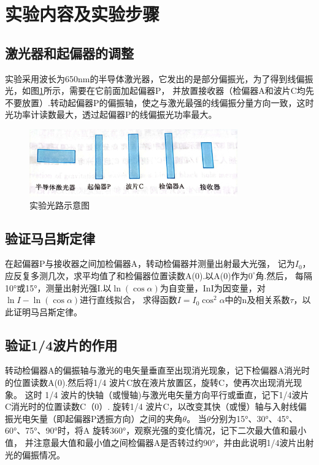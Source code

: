 \documentclass{ctexart}
\begin{document}
\section{实验内容及实验步骤}
  \subsection{激光器和起偏器的调整}
  实验采用波长为650nm的半导体激光器，它发出的是部分偏振光，为了得到线偏振光，如图\ref{shiyanguanglu}所示，需要在它前面加起偏器P，
  并放置接收器（检偏器A和波片C均先不要放置）.转动起偏器P的偏振轴，使之与激光最强的线偏振分量方向一致，这时光功率计读数最大，透过起偏器P的线偏振光功率最大。
  
  \begin{figure}[H]\label{shiyanguanglu}
    \centering
    \includegraphics[width=0.8\textwidth,height=0.3\textheight]{shiyanguanglu.jpg}
    \caption{实验光路示意图}
  \end{figure}

  \subsection{验证马吕斯定律}
  在起偏器P与接收器之间加检偏器A，转动检偏器并测量出射最大光强，
  记为$I_{0}$，应反复多测几次，求平均值了和检偏器位置读数A(0).以A(0)作为$0^{\circ}$角.然后，
  每隔10°或15°，测量出射光强I.以$\ln (\cos \alpha)$为自变量，InI为因变量，对$\ln I-\ln(\cos \alpha)$进行直线拟合，
  求得函数$I=I_{0}\cos^{2}\alpha$中的n及相关系数$\tau$，以此证明马吕斯定律。

  \subsection{验证1/4波片的作用}
  转动检偏器A的偏振轴与激光的电矢量垂直至出现消光现象，记下检偏器A消光时的位置读数A(0).然后将1/4 
  波片C放在液片放置区，旋转C，使再次出现消光现象。
  这时 1/4 波片的快轴（或慢轴)与激光电矢量方向平行或垂直，记下1/4波片C消光时的位置读数C（0）.
  旋转1/4 波片C，以改变其快（或慢）轴与入射线偏振光电矢量（即起偏器P透振方向）之间的夹角$\theta$。
  当$\theta$分别为15°、30°、45°、60°、75°、90°时，将A 旋转360°，观察光强的变化情况，记下二次最大值和最小值，
  并注意最大值和最小值之间检偏器A是否转过约90°，并由此说明1/4波片出射光的偏振情况。
\end{document}
